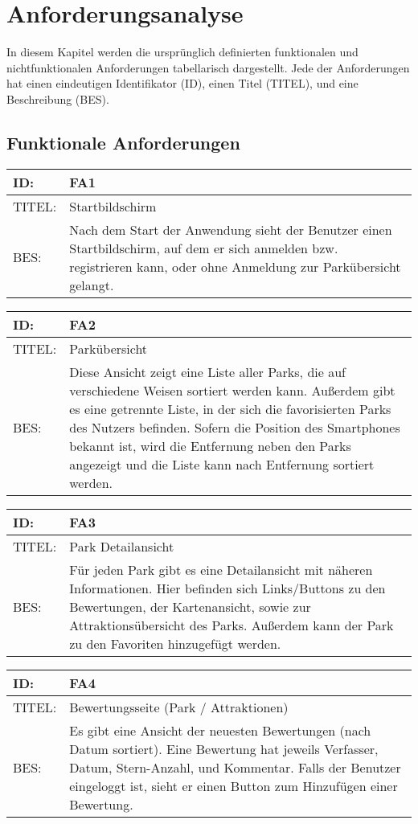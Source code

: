 \newcommand{\reqtable}[3]{
	\vspace{-1cm}
    \begin{center}
    \begin{tabular}{ | l | p{13cm} |}
    \hline
    \textbf{ID:} & \textbf{#1} \\ \hline
    TITEL: & #2 \\ \hline
    BES: & #3 \\
    \hline
    \end{tabular}
    \end{center}
}

\chapter{Anforderungsanalyse}	
\label{cha:anforderungsanalyse}
In diesem Kapitel werden die ursprünglich definierten funktionalen und nichtfunktionalen Anforderungen tabellarisch dargestellt. Jede der Anforderungen hat einen eindeutigen Identifikator (ID), einen Titel (TITEL), und eine Beschreibung (BES).

\section{Funktionale Anforderungen}
\label{sec:anforderungsanalyse:funktional}

\reqtable{FA1}{Startbildschirm}{Nach dem Start der Anwendung sieht der Benutzer einen 
Startbildschirm, auf dem er sich anmelden bzw. registrieren kann, oder ohne Anmeldung zur 
Parkübersicht gelangt.}

\reqtable{FA2}{Parkübersicht}{Diese Ansicht zeigt eine Liste aller Parks, die auf verschiedene 
Weisen sortiert werden kann. Außerdem gibt es eine getrennte Liste, in der sich die favorisierten 
Parks des Nutzers befinden. Sofern die Position des Smartphones bekannt ist, wird die Entfernung 
neben den Parks angezeigt und die Liste kann nach Entfernung sortiert werden.}

\reqtable{FA3}{Park Detailansicht}{Für jeden Park gibt es eine Detailansicht mit näheren 
Informationen. Hier befinden sich Links/Buttons zu den Bewertungen, der Kartenansicht, sowie zur 
Attraktionsübersicht des Parks. Außerdem kann der Park zu den Favoriten hinzugefügt werden.}

\reqtable{FA4}{Bewertungsseite (Park / Attraktionen)}{Es gibt eine Ansicht der neuesten Bewertungen 
(nach Datum sortiert). Eine Bewertung hat jeweils Verfasser, Datum, Stern-Anzahl, und Kommentar. 
Falls der Benutzer eingeloggt ist, sieht er einen Button zum Hinzufügen einer Bewertung.}

